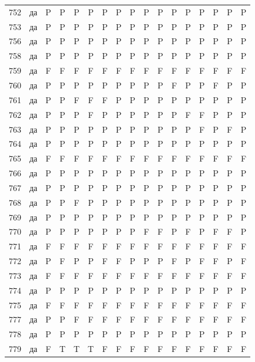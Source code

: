 \begin{table}[p]
\begin{tabular*}{\textwidth}{@{\extracolsep{\fill}}rcccccccccccccccc}
752 & да & P & P & P & P & P & P & P & P & P & P & P & P & P & P & P\\
753 & да & P & P & P & P & P & P & P & P & P & P & P & P & P & P & P\\
756 & да & P & P & P & P & P & P & P & P & P & P & P & P & P & P & P\\
758 & да & P & P & P & P & P & P & P & P & P & P & P & P & P & P & P\\
759 & да & F & F & F & F & F & F & F & F & F & F & F & F & F & F & F\\
760 & да & P & P & P & P & P & P & P & P & P & F & P & P & F & P & P\\
761 & да & P & P & F & F & F & P & P & P & P & P & P & P & P & P & P\\
762 & да & P & P & P & F & P & P & P & P & P & P & F & F & P & P & P\\
763 & да & P & P & P & P & P & P & P & P & P & P & P & F & P & F & P\\
764 & да & P & P & P & P & P & P & P & P & P & P & P & P & P & P & P\\
765 & да & F & F & F & F & F & F & F & F & F & F & F & F & F & F & F\\
766 & да & P & P & P & P & P & P & P & P & P & P & P & P & P & P & P\\
767 & да & P & P & P & P & P & P & P & P & P & P & P & P & P & P & P\\
768 & да & P & P & F & P & P & P & P & P & P & P & P & P & P & P & P\\
769 & да & P & P & P & P & P & P & P & P & P & P & P & P & P & P & P\\
770 & да & P & P & P & P & P & P & P & F & F & P & F & P & F & F & P\\
771 & да & F & F & F & F & F & F & F & F & F & F & F & F & F & F & F\\
772 & да & P & F & P & P & F & F & P & P & P & F & P & F & F & P & F\\
773 & да & F & F & F & F & F & F & F & F & F & F & F & F & F & F & F\\
774 & да & P & P & P & P & P & P & P & P & P & P & P & P & P & P & P\\
775 & да & F & F & F & F & F & F & F & F & F & F & F & F & F & F & F\\
777 & да & P & P & F & F & F & F & F & F & F & F & F & F & F & F & F\\
778 & да & P & P & P & P & P & P & P & P & P & P & P & P & P & P & P\\
779 & да & F & T & T & T & F & F & F & F & F & F & F & F & F & F & F\\
\bottomrule\end{tabular*}\end{table}
\clearpage


